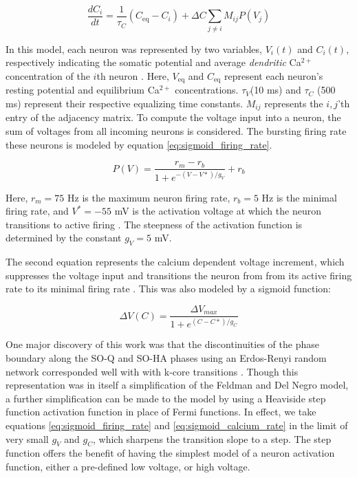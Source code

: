 \documentclass[11pt,letterpaper]{article}
\begin{document}
\begin{equation}
\label{eq:calcium_increment}
\frac{dC_i}{dt}=\frac{1}{\tau _C}(C_\text{eq} - C_i) + \Delta C\sum _{j \neq i}M_{ij}P(V_j)
\end{equation}

In this model, each neuron was represented by two variables, $V_i(t)$ and $C_i(t)$, respectively indicating the somatic potential and average \textit{dendritic} Ca$^{2+}$ concentration of the $i$th neuron \cite{kcore_paper}. Here, $V_\text{eq}$ and $C_\text{eq}$ represent each neuron's resting potential and equilibrium Ca$^{2+}$ concentrations. $\tau_V$(10 ms) and $\tau_C$ (500 ms) \cite{koch} represent their respective equalizing time constants\cite{kcore_paper}. $M_{ij}$ represents the $i,j$'th entry of the adjacency matrix. To compute the voltage input into a neuron, the sum of voltages from all incoming neurons is considered. The bursting firing rate these neurons is modeled by equation \ref{eq:sigmoid_firing_rate}.

\begin{equation}
\label{eq:sigmoid_firing_rate}
P(V) = \frac{r_m-r_b}{1+e^{-(V-V*)/g_V}}+r_b
\end{equation}

Here, $r_m = 75$ Hz is the maximum neuron firing rate, $r_b = 5$ Hz is the minimal firing rate, and $V^* = -55$ mV is the activation voltage at which the neuron transitions to active firing \cite{kcore_paper}. The steepness of the activation function is determined by the constant $g_V = 5$ mV.

The second equation represents the calcium dependent voltage increment, which suppresses the voltage input and transitions the neuron from from its active firing rate to its minimal firing rate \cite{kcore_paper}. This was also modeled by a sigmoid function:

\begin{equation}
\label{eq:sigmoid_calcium_rate}
\Delta V(C)=\frac{\Delta V_{max}}{1+e^{(C-C*)/g_C}}
\end{equation}

One major discovery of this work was that the discontinuities of the phase boundary along the SO-Q and SO-HA phases using an Erdos-Renyi random network corresponded well with with k-core transitions \cite{kcore_paper}. Though this representation was in itself a simplification of the Feldman and Del Negro model, a further simplification can be made to the model by using a Heaviside step function activation function in place of Fermi functions. In effect, we take equations \ref{eq:sigmoid_firing_rate} and \ref{eq:sigmoid_calcium_rate} in the limit of very small $g_V$ and $g_C$, which sharpens the transition slope to a step. The step function offers the benefit of having the simplest model of a neuron activation function, either a pre-defined low voltage, or high voltage.\\
\end{document}
